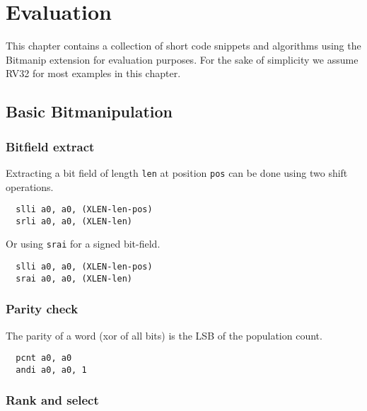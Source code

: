 \chapter{Evaluation}

This chapter contains a collection of short code snippets and algorithms using
the Bitmanip extension for evaluation purposes. For the sake of simplicity we
assume RV32 for most examples in this chapter.


\section{Basic Bitmanipulation}


\subsection{Bitfield extract}

Extracting a bit field of length {\tt len} at position {\tt pos} can be done using
two shift operations.

\begin{verbatim}
  slli a0, a0, (XLEN-len-pos)
  srli a0, a0, (XLEN-len)
\end{verbatim}

Or using {\tt srai} for a signed bit-field.

\begin{verbatim}
  slli a0, a0, (XLEN-len-pos)
  srai a0, a0, (XLEN-len)
\end{verbatim}


\subsection{Parity check}

The parity of a word (xor of all bits) is the LSB of the population count.

\begin{verbatim}
  pcnt a0, a0
  andi a0, a0, 1
\end{verbatim}


\subsection{Rank and select}

